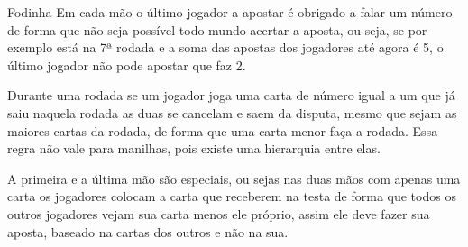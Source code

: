 \begin{subsecao}{Fodinha}
Em cada mão o último jogador a apostar é obrigado a falar um número de forma que não seja possível todo mundo acertar a 
aposta, ou seja, se por exemplo está na 7ª rodada e a soma das apostas dos jogadores até agora é 5, o último jogador não pode 
apostar que faz 2.

Durante uma rodada se um jogador joga uma carta de número igual a um que já saiu naquela rodada as duas se cancelam e saem da 
disputa, mesmo que sejam as maiores cartas da rodada, de forma que uma carta menor faça a rodada. Essa regra não vale para 
manilhas, pois existe uma hierarquia entre elas.

A primeira e a última mão são especiais, ou sejas nas duas mãos com apenas uma 
carta os jogadores colocam a carta que receberem na testa de forma que todos os outros jogadores 
vejam sua carta menos ele próprio, assim ele deve fazer sua aposta, baseado na cartas dos outros e não na sua.

\end{subsecao}

